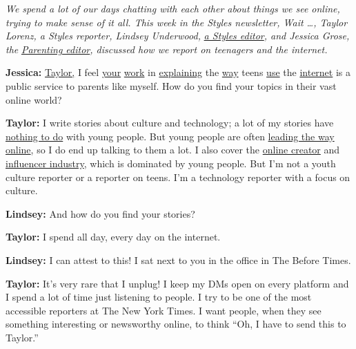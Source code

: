 \emph{We spend a lot of our days chatting with each other about things
we see online, trying to make sense of it all. This week in the Styles
newsletter, Wait \ldots{}, Taylor Lorenz, a Styles reporter, Lindsey
Underwood,} \href{https://www.nytimes.com/section/style}{\emph{a Styles
editor}}\emph{, and Jessica Grose, the}
\href{https://www.nytimes.com/section/parenting}{\emph{Parenting
editor}}\emph{, discussed how we report on teenagers and the internet.}

\textbf{Jessica:}
\href{https://www.nytimes.com/by/taylor-lorenz}{Taylor,} I feel
\href{https://www.nytimes.com/2020/07/14/style/what-is-the-cake-meme.html}{your}
\href{https://www.nytimes.com/2020/07/02/style/tati-devin-tiktok.html}{work}
in
\href{https://www.nytimes.com/2020/06/24/style/roller-skating-is-back-baby-taylor-lorenz.html}{explaining}
the
\href{https://www.nytimes.com/2020/06/16/style/blm-accounts-social-media-high-school.html}{way}
teens
\href{https://www.nytimes.com/2020/06/02/style/police-protests-video.html}{use}
the
\href{https://www.nytimes.com/2020/05/19/style/call-her-daddy-podcast.html}{internet}
is a public service to parents like myself. How do you find your topics
in their vast online world?

\textbf{Taylor:} I write stories about culture and technology; a lot of
my stories have
\href{https://www.nytimes.com/2020/06/24/style/roller-skating-is-back-baby-taylor-lorenz.html}{nothing
to do} with young people. But young people are often
\href{https://www.nytimes.com/2020/04/30/style/instagram-yearbook-coronavirus.html}{leading
the way online}, so I do end up talking to them a lot. I also cover the
\href{https://www.nytimes.com/2020/06/29/style/shane-dawson-jeffree-star-youtube-taylor-lorenz.html}{online
creator} and
\href{https://www.nytimes.com/2020/05/21/style/tiktok-collab-houses-quarantine-coronavirus.html}{influencer
industry}, which is dominated by young people. But I'm not a youth
culture reporter or a reporter on teens. I'm a technology reporter with
a focus on culture.

\textbf{Lindsey:} And how do you find your stories?

\textbf{Taylor:} I spend all day, every day on the internet.

\textbf{Lindsey:} I can attest to this! I sat next to you in the office
in The Before Times.

\textbf{Taylor:} It's very rare that I unplug! I keep my DMs open on
every platform and I spend a lot of time just listening to people. I try
to be one of the most accessible reporters at The New York Times. I want
people, when they see something interesting or newsworthy online, to
think ``Oh, I have to send this to Taylor.''

